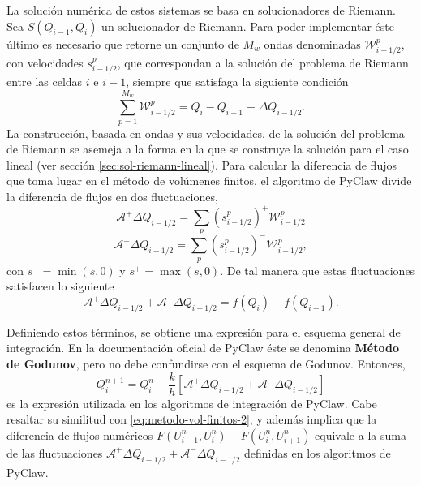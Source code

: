 La solución numérica de estos sistemas se basa en solucionadores de Riemann. Sea $S(Q_{i-1}, Q_{i})$ un solucionador de Riemann. Para poder implementar éste último es necesario que retorne un conjunto de $M_{w}$ ondas denominadas $\mathcal{W}_{i-1/2}^{p}$, con velocidades $s_{i-1/2}^{p}$, que correspondan a la solución del problema de Riemann entre las celdas $i$ e $i-1$, siempre que satisfaga la siguiente condición
\begin{equation}
	\sum_{p=1}^{M_{w}}\mathcal{W}_{i-1/2}^{p} = Q_i - Q_{i-1} \equiv \Delta Q_{i-1/2}.
\end{equation}
La construcción, basada en ondas y sus velocidades, de la solución del problema de Riemann se asemeja a la forma en la que se construye la solución para el caso lineal (ver sección \ref{sec:sol-riemann-lineal}). Para calcular la diferencia de flujos que toma lugar en el método de volúmenes finitos, el algoritmo de PyClaw divide la diferencia de flujos en dos fluctuaciones,
\begin{equation}
	\mathcal{A}^{+}\Delta Q_{i-1/2} = \sum_{p}(s_{i-1/2}^{p})^{+}\mathcal{W}_{i-1/2}^{p}
\end{equation}
\begin{equation}
	\mathcal{A}^{-}\Delta Q_{i-1/2} = \sum_{p}(s_{i-1/2}^{p})^{-}\mathcal{W}_{i-1/2}^{p},
\end{equation}
con $s^{-} = \min(s,0)$ y $s^{+} = \max(s,0)$. De tal manera que estas fluctuaciones satisfacen lo siguiente
\begin{equation}
	\mathcal{A}^{+}\Delta Q_{i-1/2} + \mathcal{A}^{-}\Delta Q_{i-1/2} = f(Q_{i})-f(Q_{i-1}).
\end{equation}

Definiendo estos términos, se obtiene una expresión para el esquema general de integración. En la documentación oficial de PyClaw éste se denomina \textbf{Método de Godunov}, pero no debe confundirse con el esquema de Godunov. Entonces,
\begin{equation}
	Q_{i}^{n+1} = Q_{i}^{n} - \frac{k}{h}\left[\mathcal{A}^{+}\Delta Q_{i-1/2} + \mathcal{A}^{-}\Delta Q_{i-1/2}\right]
	\label{eq:pyclaw-scheme}
\end{equation}
es la expresión utilizada en los algoritmos de integración de PyClaw. Cabe resaltar su similitud con \eqref{eq:metodo-vol-finitos-2}, y además implica que la diferencia de flujos numéricos $F(U_{i-1}^n, U_i^n) - F(U_{i}^n, U_{i+1}^n)$ equivale a la suma de las fluctuaciones $\mathcal{A}^{+}\Delta Q_{i-1/2} + \mathcal{A}^{-}\Delta Q_{i-1/2}$ definidas en los algoritmos de PyClaw.

